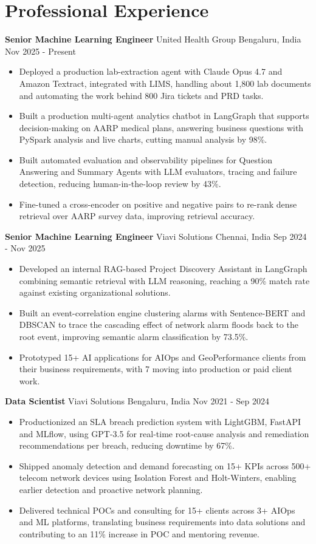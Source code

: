 \documentclass[10pt,a4paper]{article}
\newcommand{\role}[4]{\textbf{#1} \textbar{} #2 \hfill #3 \textbar{} #4\par}
\begin{document}
\section{Professional Experience}
\role{Senior Machine Learning Engineer}{United Health Group}{Bengaluru, India}{Nov 2025 - Present}
\begin{itemize}
  \item Deployed a production lab-extraction agent with Claude Opus 4.7 and Amazon Textract, integrated with LIMS, handling about 1,800 lab documents and automating the work behind 800 Jira tickets and PRD tasks.
  \item Built a production multi-agent analytics chatbot in LangGraph that supports decision-making on AARP medical plans, answering business questions with PySpark analysis and live charts, cutting manual analysis by 98\%.
  \item Built automated evaluation and observability pipelines for Question Answering and Summary Agents with LLM evaluators, tracing and failure detection, reducing human-in-the-loop review by 43\%.
  \item Fine-tuned a cross-encoder on positive and negative pairs to re-rank dense retrieval over AARP survey data, improving retrieval accuracy.
\end{itemize}
\vspace{3pt}
\role{Senior Machine Learning Engineer}{Viavi Solutions}{Chennai, India}{Sep 2024 - Nov 2025}
\begin{itemize}
  \item Developed an internal RAG-based Project Discovery Assistant in LangGraph combining semantic retrieval with LLM reasoning, reaching a 90\% match rate against existing organizational solutions.
  \item Built an event-correlation engine clustering alarms with Sentence-BERT and DBSCAN to trace the cascading effect of network alarm floods back to the root event, improving semantic alarm classification by 73.5\%.
  \item Prototyped 15+ AI applications for AIOps and GeoPerformance clients from their business requirements, with 7 moving into production or paid client work.
\end{itemize}
\vspace{3pt}
\role{Data Scientist}{Viavi Solutions}{Bengaluru, India}{Nov 2021 - Sep 2024}
\begin{itemize}
  \item Productionized an SLA breach prediction system with LightGBM, FastAPI and MLflow, using GPT-3.5 for real-time root-cause analysis and remediation recommendations per breach, reducing downtime by 67\%.
  \item Shipped anomaly detection and demand forecasting on 15+ KPIs across 500+ telecom network devices using Isolation Forest and Holt-Winters, enabling earlier detection and proactive network planning.
  \item Delivered technical POCs and consulting for 15+ clients across 3+ AIOps and ML platforms, translating business requirements into data solutions and contributing to an 11\% increase in POC and mentoring revenue.
\end{itemize}
\end{document}
